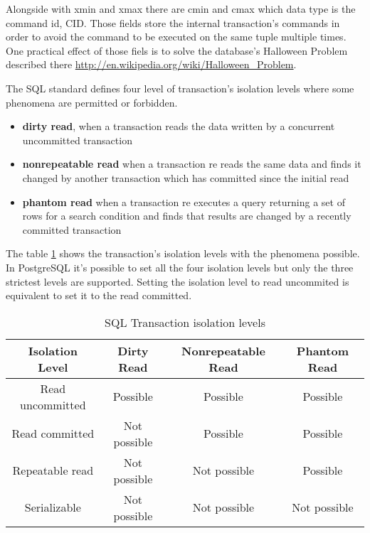 Alongside with xmin and xmax there are cmin and cmax which data type is the command id, CID. Those fields
store the internal transaction's commands in order to avoid the command to be executed on the same tuple
multiple times. One practical effect of those fiels is to solve the database's Halloween Problem
described there \href{http://en.wikipedia.org/wiki/Halloween_Problem}{
http://en.wikipedia.org/wiki/Halloween\_Problem}.\newline

The SQL standard defines four level of transaction's isolation levels where 
some phenomena are permitted or forbidden.

\begin{itemize}
 \item \textbf{dirty read}, when a transaction reads the data written by a concurrent 
uncommitted transaction

\item \textbf{nonrepeatable read} when a transaction re reads the same data and finds it changed by
another transaction which has committed since the initial read

\item \textbf{phantom read} when a transaction re executes a query returning a set 
of rows for a search condition and finds that results are changed by a recently committed 
transaction

\end{itemize}

The table \ref{tab:TRNISOLATION} shows the transaction's isolation levels with the phenomena
possible. In PostgreSQL it's possible to set all the four isolation levels but only the three
strictest levels are supported. Setting the  isolation level to read uncommited is
equivalent to set it to the read committed.

\begin{table}[H]
  \begin{tabular}{cccc}
    Isolation Level & Dirty Read    &    Nonrepeatable Read   &   Phantom 
Read\\ 
    \hline
    Read uncommitted  &  Possible    &    Possible     &   Possible\\
    Read committed    &  Not possible &  Possible     &   Possible\\
    Repeatable read   &  Not possible  & Not possible  &  Possible\\
    Serializable      &  Not possible  & Not possible   & Not possible\\
  \end{tabular}
  \caption{\label{tab:TRNISOLATION}SQL Transaction isolation levels}
\end{table}

